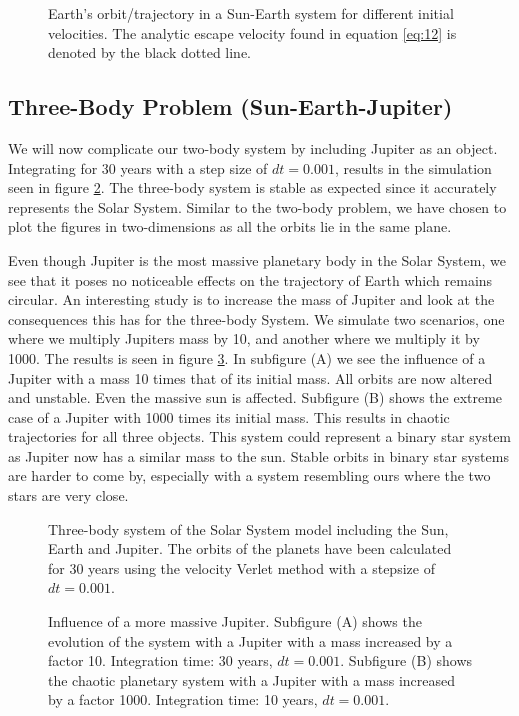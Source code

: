 \documentclass[a4paper, 10pt, reqno]{amsart}
\begin{document}
\begin{figure}
    \centering
    
    \caption{Earth's orbit/trajectory in a Sun-Earth system for different initial velocities. The analytic escape velocity found in equation \ref{eq:12} is denoted by the black dotted line.}
    \label{fig:escapevel}
\end{figure}

\subsection{Three-Body Problem (Sun-Earth-Jupiter) }
We will now complicate our two-body system by including Jupiter as an object. Integrating for 30 years with a step size of $dt = 0.001$, results in the simulation seen in figure \ref{fig:3body}. The three-body system is stable as expected since it accurately represents the Solar System. Similar to the two-body problem, we have chosen to plot the figures in two-dimensions as all the orbits lie in the same plane.

Even though Jupiter is the most massive planetary body in the Solar System, we see that it poses no noticeable effects on the trajectory of Earth which remains circular. An interesting study is to increase the mass of Jupiter and look at the consequences this has for the three-body System. We simulate two scenarios, one where we multiply Jupiters mass by 10, and another where we multiply it by 1000. The results is seen in figure \ref{fig:jupiterx}. In subfigure (A) we see the influence of a Jupiter with a mass 10 times that of its initial mass. All orbits are now altered and unstable. Even the massive sun is affected. Subfigure (B) shows the extreme case of a Jupiter with 1000 times its initial mass. This results in chaotic trajectories for all three objects. This system could represent a binary star system as Jupiter now has a similar mass to the sun. Stable orbits in binary star systems are harder to come by, especially with a system resembling ours where the two stars are very close.

  \begin{figure}
      \centering
      
      \caption{Three-body system of the Solar System model including the Sun, Earth and Jupiter. The orbits of the planets have been calculated for 30 years using the velocity Verlet method with a stepsize of $dt = 0.001$.}
      \label{fig:3body}
  \end{figure}
 
  \begin{figure}
     \centering
     \caption{Influence of a more massive Jupiter. Subfigure (\small{A}) shows the evolution of the system with a Jupiter with a mass increased by a factor 10. Integration time: 30 years, $dt = 0.001$. Subfigure (\small{B}) shows the chaotic planetary system with a Jupiter with a mass increased by a factor 1000. Integration time: 10 years, $dt = 0.001$.}
     \label{fig:jupiterx}
 \end{figure}
\end{document}
